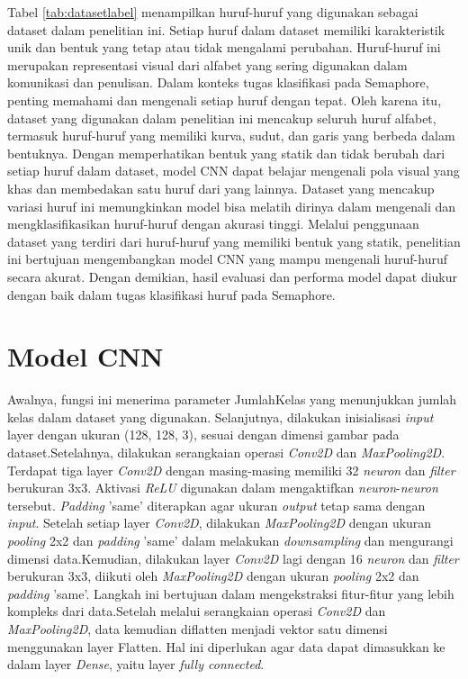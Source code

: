 Tabel \ref{tab:datasetlabel} menampilkan huruf-huruf yang digunakan sebagai dataset dalam penelitian ini. Setiap huruf dalam dataset memiliki karakteristik unik dan bentuk yang tetap atau tidak mengalami perubahan. Huruf-huruf ini merupakan representasi visual dari alfabet yang sering digunakan dalam komunikasi dan penulisan. Dalam konteks tugas klasifikasi pada Semaphore, penting memahami dan mengenali setiap huruf dengan tepat. Oleh karena itu, dataset yang digunakan dalam penelitian ini mencakup seluruh huruf alfabet, termasuk huruf-huruf yang memiliki kurva, sudut, dan garis yang berbeda dalam bentuknya. Dengan memperhatikan bentuk yang statik dan tidak berubah dari setiap huruf dalam dataset, model CNN dapat belajar  mengenali pola visual yang khas dan membedakan satu huruf dari yang lainnya. Dataset yang mencakup variasi huruf ini memungkinkan model bisa melatih dirinya dalam mengenali dan mengklasifikasikan huruf-huruf dengan akurasi tinggi. Melalui penggunaan dataset yang terdiri dari huruf-huruf yang memiliki bentuk yang statik, penelitian ini bertujuan mengembangkan model CNN yang mampu mengenali huruf-huruf secara akurat. Dengan demikian, hasil evaluasi dan performa model dapat diukur dengan baik dalam tugas klasifikasi huruf pada Semaphore.

\section{Model CNN}
Awalnya, fungsi ini menerima parameter JumlahKelas yang menunjukkan jumlah kelas dalam dataset yang digunakan. Selanjutnya, dilakukan inisialisasi \textit{input} layer dengan ukuran (128, 128, 3), sesuai dengan dimensi gambar pada dataset.Setelahnya, dilakukan serangkaian operasi \textit{Conv2D} dan \textit{MaxPooling2D}. Terdapat tiga layer \textit{Conv2D} dengan masing-masing memiliki 32 \textit{neuron} dan \textit{filter} berukuran 3x3. Aktivasi \textit{ReLU} digunakan dalam mengaktifkan \textit{neuron}-\textit{neuron} tersebut. \textit{Padding} 'same' diterapkan agar ukuran \textit{output} tetap sama dengan \textit{input}. Setelah setiap layer \textit{Conv2D}, dilakukan \textit{MaxPooling2D} dengan ukuran \textit{pooling} 2x2 dan \textit{padding} 'same' dalam melakukan \textit{downsampling} dan mengurangi dimensi data.Kemudian, dilakukan layer \textit{Conv2D} lagi dengan 16 \textit{neuron} dan \textit{filter} berukuran 3x3, diikuti oleh \textit{MaxPooling2D} dengan ukuran \textit{pooling} 2x2 dan \textit{padding} 'same'. Langkah ini bertujuan dalam mengekstraksi fitur-fitur yang lebih kompleks dari data.Setelah melalui serangkaian operasi \textit{Conv2D} dan \textit{MaxPooling2D}, data kemudian diflatten menjadi vektor satu dimensi menggunakan layer Flatten. Hal ini diperlukan agar data dapat dimasukkan ke dalam layer \textit{Dense}, yaitu layer \textit{fully connected}.

